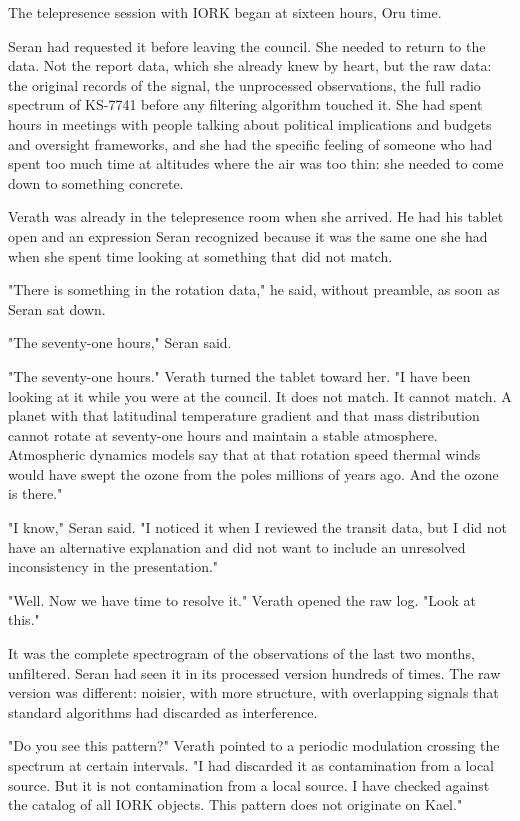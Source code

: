 \documentclass[11pt,a5paper,twoside]{book}
\begin{document}
The telepresence session with IORK began at sixteen hours, Oru time.

Seran had requested it before leaving the council. She needed to return to the data. Not the report data, which she already knew by heart, but the raw data: the original records of the signal, the unprocessed observations, the full radio spectrum of KS-7741 before any filtering algorithm touched it. She had spent hours in meetings with people talking about political implications and budgets and oversight frameworks, and she had the specific feeling of someone who had spent too much time at altitudes where the air was too thin: she needed to come down to something concrete.

Verath was already in the telepresence room when she arrived. He had his tablet open and an expression Seran recognized because it was the same one she had when she spent time looking at something that did not match.

"There is something in the rotation data," he said, without preamble, as soon as Seran sat down.

"The seventy-one hours," Seran said.

"The seventy-one hours." Verath turned the tablet toward her. "I have been looking at it while you were at the council. It does not match. It cannot match. A planet with that latitudinal temperature gradient and that mass distribution cannot rotate at seventy-one hours and maintain a stable atmosphere. Atmospheric dynamics models say that at that rotation speed thermal winds would have swept the ozone from the poles millions of years ago. And the ozone is there."

"I know," Seran said. "I noticed it when I reviewed the transit data, but I did not have an alternative explanation and did not want to include an unresolved inconsistency in the presentation."

"Well. Now we have time to resolve it." Verath opened the raw log. "Look at this."

It was the complete spectrogram of the observations of the last two months, unfiltered. Seran had seen it in its processed version hundreds of times. The raw version was different: noisier, with more structure, with overlapping signals that standard algorithms had discarded as interference.

"Do you see this pattern?" Verath pointed to a periodic modulation crossing the spectrum at certain intervals. "I had discarded it as contamination from a local source. But it is not contamination from a local source. I have checked against the catalog of all IORK objects. This pattern does not originate on Kael."
\end{document}

